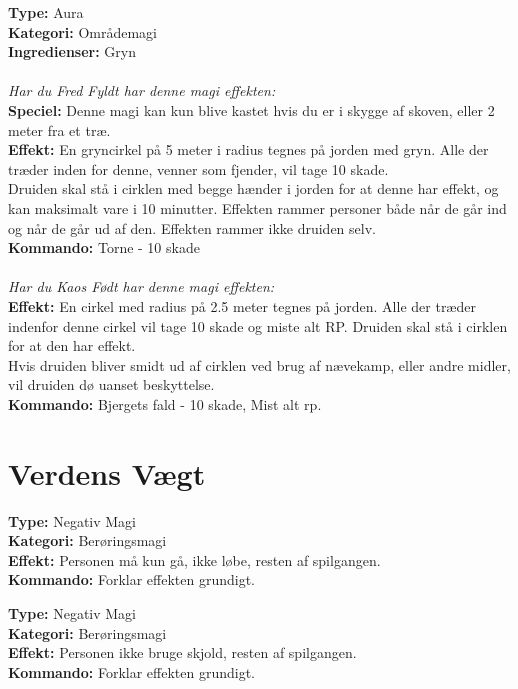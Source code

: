 \begin{nly*}
\textbf{Type:} Aura  \\
\textbf{Kategori:} Områdemagi\\
\textbf{Ingredienser:} Gryn\\
\\
\emph{\textit{Har du Fred Fyldt har denne magi effekten:}}\\
\textbf{Speciel:} Denne magi kan kun blive kastet hvis du er i skygge af skoven, eller 2 meter fra et træ.\\
\textbf{Effekt:} En gryncirkel på 5 meter i radius tegnes på jorden med gryn. Alle der træder inden for denne, venner som fjender, vil tage 10 skade.\\ 
Druiden skal stå i cirklen med begge hænder i jorden for at denne har effekt, og kan maksimalt vare i 10 minutter. Effekten rammer personer både når de går ind og når de går ud af den. Effekten rammer ikke druiden selv.\\
\textbf{Kommando:} Torne - 10 skade\\
\\
\emph{\textit{Har du Kaos Født har denne magi effekten:}}\\
\textbf{Effekt:} En cirkel med radius på 2.5 meter tegnes på jorden. Alle der træder indenfor denne cirkel vil tage 10 skade og miste alt RP. Druiden skal stå i cirklen for at den har effekt. \\
Hvis druiden bliver smidt ud af cirklen ved brug af nævekamp, eller andre midler, vil druiden dø uanset beskyttelse.\\
\textbf{Kommando:} Bjergets fald - 10 skade, Mist alt rp.
\end{nly*}
\section{Verdens Vægt}

\begin{jord*}
\textbf{Type:} Negativ Magi\\
\textbf{Kategori:} Berøringsmagi\\
\textbf{Effekt:} Personen må kun gå, ikke løbe, resten af spilgangen.\\
\textbf{Kommando:} Forklar effekten grundigt.
\end{jord*}

\begin{jord*}
\textbf{Type:} Negativ Magi\\
\textbf{Kategori:} Berøringsmagi\\
\textbf{Effekt:} Personen ikke bruge skjold, resten af spilgangen.\\
\textbf{Kommando:} Forklar effekten grundigt.
\end{jord*}

